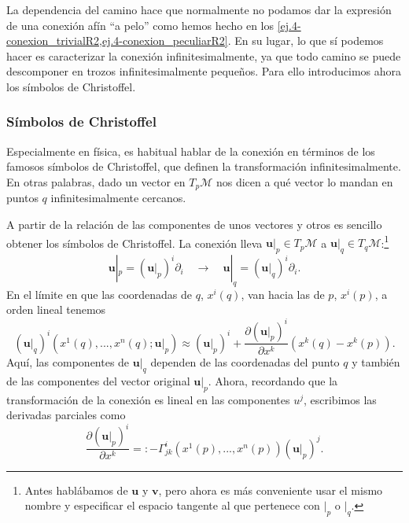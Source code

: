 La dependencia del camino hace que normalmente no podamos dar la expresión de una conexión afín ``a pelo'' como hemos hecho en los \cref{ej.4-conexion_trivialR2,ej.4-conexion_peculiarR2}. En su lugar, lo que sí podemos hacer es caracterizar la conexión infinitesimalmente, ya que todo camino se puede descomponer en trozos infinitesimalmente pequeños. Para ello introducimos ahora los símbolos de Christoffel.

\subsubsection{Símbolos de Christoffel}
\label{subsubsec.4christoffel}

Especialmente en física, es habitual hablar de la conexión en términos de los famosos símbolos de Christoffel, que definen la transformación infinitesimalmente. En otras palabras, dado un vector en \(T_p\mathcal{M}\) nos dicen a qué vector lo mandan en puntos \(q\) infinitesimalmente cercanos. 

A partir de la relación de las componentes de unos vectores y otros es sencillo obtener los símbolos de Christoffel. La conexión lleva \(\mathbf{u}|_p\in T_p\mathcal{M}\) a \(\mathbf{u}|_q\in T_q\mathcal{M}\):\footnote{Antes hablábamos de \(\mathbf{u}\) y \(\mathbf{v}\), pero ahora es más conveniente usar el mismo nombre y especificar el espacio tangente al que pertenece con \(|_p\) o \(|_q\).}
\begin{equation*}
    \mathbf{u}|_p = \left(\mathbf{u}|_p\right)^i \partial_i \quad\longrightarrow\quad \mathbf{u}|_q = \left(\mathbf{u}|_q\right)^i \partial_i.
\end{equation*}
En el límite en que las coordenadas de \(q\), \(x^i(q)\), van hacia las de \(p\), \(x^i(p)\), a orden lineal tenemos
\begin{equation}
    \left(\mathbf{u}|_q\right)^i\left(x^1(q), ..., x^n(q); \mathbf{u}|_p\right)\approx \left(\mathbf{u}|_p\right)^i + \frac{\partial \left(\mathbf{u}|_p\right)^i}{\partial x^k} \left(x^k(q) - x^k(p)\right).
\end{equation}
Aquí, las componentes de \(\mathbf{u}|_q\) dependen de las coordenadas del punto \(q\) y también de las componentes del vector original \(\mathbf{u}|_p\). Ahora, recordando que la transformación de la conexión es lineal en las componentes \(u^j\), escribimos las derivadas parciales como
\begin{equation}
    \label{eq.4-christoffel}
    \frac{\partial \left(\mathbf{u}|_p\right)^i}{\partial x^k} =: -\Gamma^{i}_{jk}\left(x^1(p),..., x^n(p)\right)\left(\mathbf{u}|_p\right)^j. 
\end{equation}

